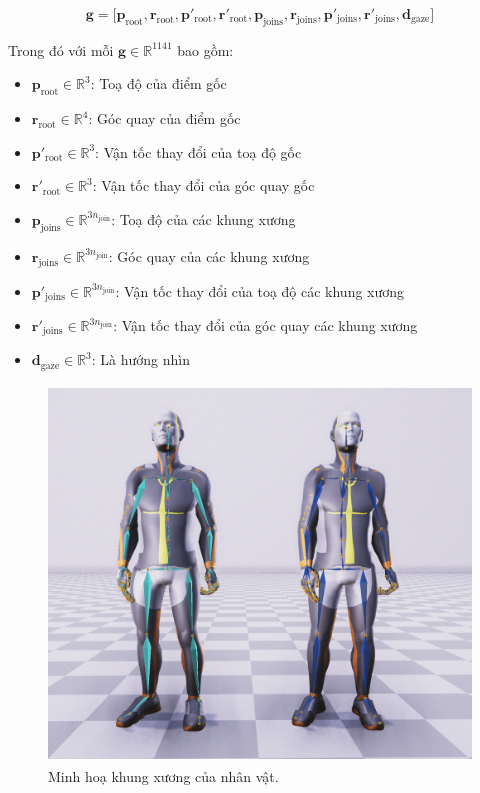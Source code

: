 \begin{equation} \label{eq:gesturevector}
\mathbf{g} = \Big[ \mathbf{p}_{\text{root}},  \mathbf{r}_{\text{root}},
\mathbf{ p }'_{\text{root}},  \mathbf{r}'_{\text{root}},
\mathbf{p}_{\text{joins}},  \mathbf{r}_{\text{joins}},
\mathbf{p}'_{\text{joins}},  \mathbf{r}'_{\text{joins}},
\mathbf{d}_{\text{gaze}}
\Big]
\end{equation}

Trong  đó với mỗi $\mathbf{g} \in \mathbb{R}^{1141}$ bao gồm:
\begin{itemize}
	\item $\mathbf{p}_{\text{root}} \in \mathbb{R}^3$: Toạ độ của điểm gốc
	\item $\mathbf{r}_{\text{root}} \in \mathbb{R}^4$: Góc quay của điểm gốc
	\item $\mathbf{p}'_{\text{root}} \in \mathbb{R}^3$: Vận tốc thay đổi của toạ độ gốc
	\item $\mathbf{r}'_{\text{root}} \in \mathbb{R}^3$: Vận tốc thay đổi của góc quay gốc
	
	\item $\mathbf{p}_{\text{joins}} \in \mathbb{R}^{3 n_{\text{join} }}$: Toạ độ của các khung xương
	\item $\mathbf{r}_{\text{joins}} \in \mathbb{R}^{3 n_{\text{join} }}$: Góc quay của các khung xương
	\item $\mathbf{p}'_{\text{joins}} \in \mathbb{R}^{3n_{\text{join} }}$: Vận tốc thay đổi của toạ độ các khung xương
	\item $\mathbf{r}'_{\text{joins}} \in \mathbb{R}^{3n_{\text{join} }}$: Vận tốc thay đổi của góc quay các khung xương
	
	\item $\mathbf{d}_{\text{gaze}} \in \mathbb{R}^3$: Là hướng nhìn
\end{itemize}

\begin{figure}
	\centering
	\includegraphics[height=10cm]{images/AnimationSample.png}
	\caption{Minh hoạ khung xương của nhân vật.}
	\label{fig:AnimationSample}
\end{figure}


